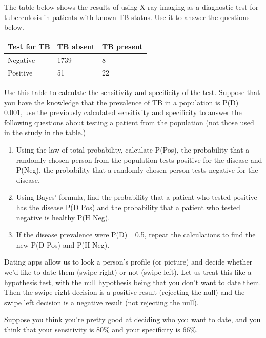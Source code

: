 \documentclass[
]{book}
\theoremstyle{definition}
\theoremstyle{definition}
\theoremstyle{definition}
\theoremstyle{remark}
\begin{document}
The table below shows the results of using X-ray imaging as a diagnostic test for tuberculosis in patients with known TB status. Use it to answer the questions below.

\begin{longtable}[]{@{}lll@{}}
\toprule
Test for TB & TB absent & TB present\tabularnewline
\midrule
\endhead
Negative & 1739 & 8\tabularnewline
Positive & 51 & 22\tabularnewline
\bottomrule
\end{longtable}

Use this table to calculate the sensitivity and specificity of the test. Suppose that you have the knowledge that the prevalence of TB in a population is P(D) = 0.001, use the previously calculated sensitivity and specificity to answer the following questions about testing a patient from the population (not those used in the study in the table.)

\begin{enumerate}
\def\labelenumi{\arabic{enumi}.}
\item
  Using the law of total probability, calculate P(Pos), the probability that a randomly chosen person from the population tests positive for the disease and P(Neg), the probability that a randomly chosen person tests negative for the disease.
\item
  Using Bayes' formula, find the probability that a patient who tested positive has the disease P(D \textbar{} Pos) and the probability that a patient who tested negative is healthy P(H \textbar{} Neg).
\item
  If the disease prevalence were P(D) =0.5, repeat the calculations to find the new P(D \textbar{} Pos) and P(H \textbar{} Neg).
\end{enumerate}

Dating apps allow us to look a person's profile (or picture) and decide whether we'd like to date them (swipe right) or not (swipe left). Let us treat this like a hypothesis test, with the null hypothesis being that you don't want to date them. Then the swipe right decision is a positive result (rejecting the null) and the swipe left decision is a negative result (not rejecting the null).

Suppose you think you're pretty good at deciding who you want to date, and you think that your sensitivity is 80\% and your specificity is 66\%.
\end{document}

